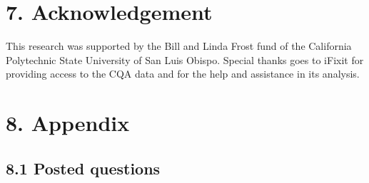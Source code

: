 \documentclass{article}
\begin{document}

\section*{7. Acknowledgement}

This research was supported by the Bill and Linda Frost fund of the California Polytechnic State University of San Luis Obispo. Special thanks goes to iFixit for providing access to the CQA data and for the help and assistance in its analysis. 


\section*{8. Appendix} 

\subsection*{8.1 Posted questions}
\end{document}
